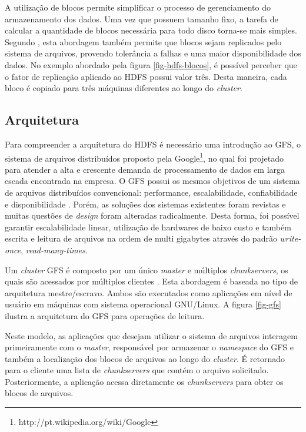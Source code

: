 A utilização de blocos permite simplificar o processo de gerenciamento do armazenamento dos dados. Uma vez que possuem tamanho fixo, a tarefa de calcular a quantidade de blocos necessária para todo disco torna-se mais simples. Segundo , esta abordagem também permite que blocos sejam replicados pelo sistema de arquivos, provendo tolerância a falhas e uma maior disponibilidade dos dados. No exemplo abordado pela figura \ref{fig-hdfs-blocos}, é possível perceber que o fator de replicação aplicado ao HDFS possui valor três. Desta maneira, cada bloco é copiado para três máquinas diferentes ao longo do \textit{cluster}.

\subsection{Arquitetura}
\label{sec-hdfs-arquitetura}

Para compreender a arquitetura do HDFS é necessário uma introdução ao GFS, o sistema de arquivos distribuídos proposto pela Google\footnote{http://pt.wikipedia.org/wiki/Google}, no qual foi projetado para atender a alta e crescente demanda de processamento de dados em larga escada encontrada na empresa. O GFS possui os mesmos objetivos de um sistema de arquivos distribuídos convencional: performance, escalabilidade, confiabilidade e disponibilidade \cite{ghemawatGfs2003}. Porém, as soluções dos sistemas existentes foram revistas e muitas questões de \textit{design} foram alteradas radicalmente. Desta forma, foi possível garantir escalabilidade linear, utilização de hardwares de baixo custo e também escrita e leitura de arquivos na ordem de multi gigabytes através do padrão \textit{write-once}, \textit{read-many-times}. 

Um \textit{cluster} GFS é composto por um único \textit{master} e múltiplos \textit{chunkservers}, os quais são acessados por múltiplos clientes \cite{ghemawatGfs2003}. Esta abordagem é baseada no tipo de arquitetura mestre/escravo. Ambos são executados como aplicações em nível de usuário em máquinas com sistema operacional GNU/Linux. A figura \ref{fig-gfs} ilustra a arquitetura do GFS para operações de leitura.

Neste modelo, as aplicações que desejam utilizar o sistema de arquivos interagem primeiramente com o \textit{master}, responsável por armazenar o \textit{namespace} do GFS e também a localização dos blocos de arquivos ao longo do \textit{cluster}. É retornado para o cliente uma lista de \textit{chunkservers} que contém o arquivo solicitado. Posteriormente, a aplicação acessa diretamente os \textit{chunkservers} para obter os blocos de arquivos.

